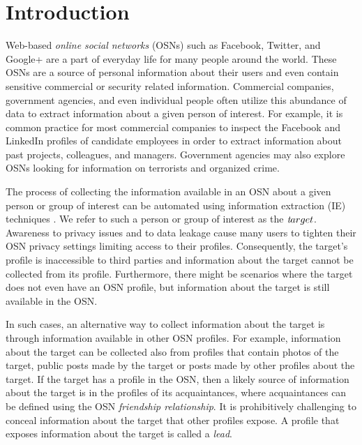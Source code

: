 \documentclass[journal]{IEEEtran}
\newcommand{\target}{{\textit target}}
\begin{document}
%
\IEEEpeerreviewmaketitle


\section{Introduction}

Web-based {\em online social networks} (OSNs) such as Facebook, Twitter, and Google+ are a part of everyday life for many people around the world. These OSNs are a source of personal information about their users and even contain sensitive commercial or security related information. Commercial companies, government agencies, and even individual people often utilize this abundance of data to extract information about a given person of interest. For example, it is common practice for most commercial companies to inspect the Facebook and LinkedIn profiles of candidate employees in order to extract information about past projects, colleagues, and managers. Government agencies may also explore OSNs looking for information on terrorists and organized crime. 

The process of collecting the information available in an OSN 
about a given person or group of interest can be automated using information extraction (IE) techniques \cite{chang2006survey}. We refer to such a person or group of interest as the $\target$. 
Awareness to privacy issues and to data leakage cause many users to tighten their OSN privacy settings limiting access to their profiles. Consequently, the target's profile is inaccessible to third parties and information about the target cannot be collected from its profile. Furthermore, there might be scenarios where the target does not even have an OSN profile, but information about the target is still available in the OSN.

In such cases, an alternative way to collect information about the target is through information available in other OSN profiles. 
For example, information about the target can be collected also from profiles that contain photos of the target, public posts made by the target or posts made by other profiles about the target.
If the target has a profile in the OSN, then a likely source of information about the target is in the profiles of its acquaintances, where acquaintances can be defined using the OSN {\em friendship relationship}.   
It is prohibitively challenging to conceal information about the target that other profiles expose.
A profile that exposes information about the target is called a {\em lead}.
\end{document}
